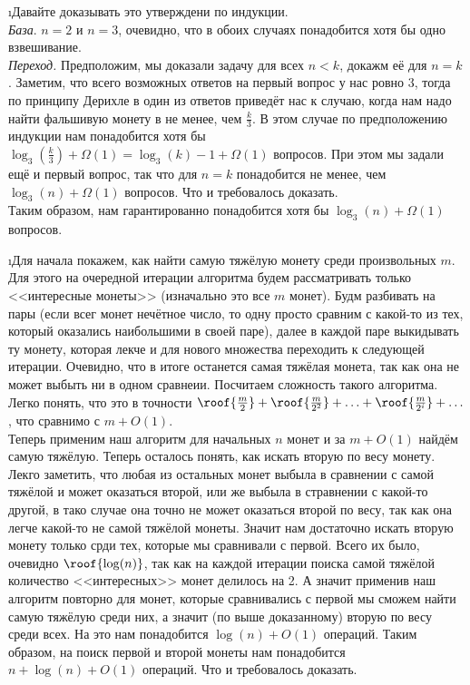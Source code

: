 \i Давайте доказывать это утверждени по индукции.\\ 
\textit{База}. $n=2$ и $n=3$, очевидно, что в обоих случаях понадобится хотя бы одно взвешивание.\\
\textit{Переход.} Предположим, мы доказали задачу для всех $n < k$, докажм её для $n=k$. Заметим, что всего возможных ответов на первый вопрос у нас ровно 3, тогда по принципу Дерихле в один из ответов приведёт нас к случаю, когда нам надо найти фальшивую монету в не менее, чем $\frac{k}{3}$. В этом случае по предположению индукции нам понадобится хотя бы $\log_3(\frac{k}{3}) + \Omega(1) = \log_3(k) - 1 + \Omega(1)$ вопросов. При этом мы задали ещё и первый вопрос, так что для $n=k$ понадобится не менее, чем $\log_3(n) + \Omega(1)$ вопросов. Что и требовалось доказать.\\
Таким образом, нам гарантированно понадобится хотя бы $\log_3(n) + \Omega(1)$ вопросов.

\i Для начала покажем, как найти самую тяжёлую монету среди произвольных $m$. Для этого на очередной итерации алгоритма будем рассматривать только <<интересные монеты>> (изначально это все $m$ монет). Будм разбивать на пары (если всег монет нечётное число, то одну просто сравним с какой-то из тех, который оказались наибольшими в своей паре), далее в каждой паре выкидывать ту монету, которая лекче и для нового множества переходить к следующей итерации. Очевидно, что в итоге останется самая тяжёлая монета, так как она не может выбыть ни в одном сравнеии. Посчитаем сложность такого алгоритма. Легко понять, что это в точности $\roof{\frac{m}{2}} + \roof{\frac{m}{2^2}} + \ldots + \roof{\frac{m}{2^i}} + \ldots$, что сравнимо с $m + O(1)$.\\
Теперь применим наш алгоритм для начальных $n$ монет и за $m + O(1)$ найдём самую тяжёлую. Теперь осталось понять, как искать вторую по весу монету. Лекго заметить, что любая из остальных монет выбыла в сравнении с самой тяжёлой и может оказаться второй, или же выбыла в стравнении с какой-то другой, в тако случае она точно не может оказаться второй по весу, так как она легче какой-то не самой тяжёлой монеты. Значит нам достаточно искать вторую монету только срди тех, которые мы сравнивали с первой. Всего их было, очевидно $\roof{\log(n)}$, так как на каждой итерации поиска самой тяжёлой количество <<интересных>> монет делилось на 2. А значит применив наш алгоритм повторно для монет, которые сравнивались с первой мы сможем найти самую тяжёлую среди них, а значит (по выше доказанному) вторую по весу среди всех. На это нам понадобится $\log(n) + O(1)$ операций. Таким образом, на поиск первой и второй монеты нам понадобится $n + \log(n) + O(1)$ операций. Что и требовалось доказать.